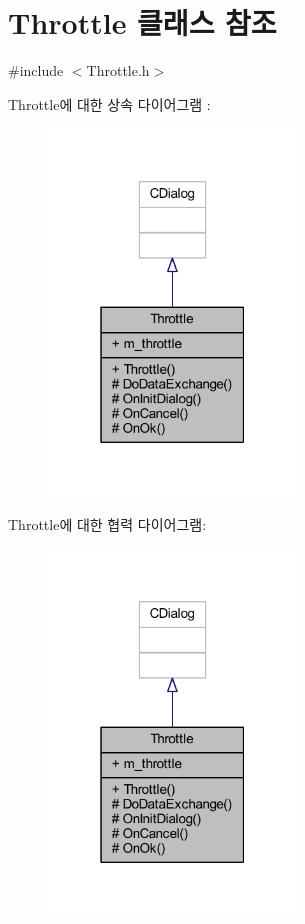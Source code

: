 \hypertarget{class_throttle}{}\section{Throttle 클래스 참조}
\label{class_throttle}


{\ttfamily \#include $<$Throttle.\+h$>$}



Throttle에 대한 상속 다이어그램 \+: \nopagebreak
\begin{figure}[H]
\begin{center}
\leavevmode
\includegraphics[width=187pt]{class_throttle__inherit__graph}
\end{center}
\end{figure}


Throttle에 대한 협력 다이어그램\+:\nopagebreak
\begin{figure}[H]
\begin{center}
\leavevmode
\includegraphics[width=187pt]{class_throttle__coll__graph}
\end{center}
\end{figure}
